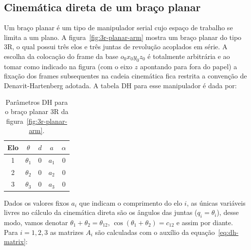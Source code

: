 \subsection{Cinemática direta de um braço planar}

Um braço planar é um tipo de manipulador serial cujo espaço de trabalho se
limita a um plano. A figura~\ref{fig:3r-planar-arm} mostra um braço planar do
tipo 3R, o qual possui três elos e três juntas de revolução acoplados em série.
A escolha da colocação do frame da base \(o_0x_0y_0z_0\) é totalmente
arbitrária e ao tomar como indicado na figura (com o eixo \(z\) apontando para
fora do papel) a fixação dos frames subsequentes na cadeia cinemática fica
restrita a convenção de Denavit-Hartenberg adotada. A tabela DH para esse
manipulador é dada por:

\begin{table}[htbp]
    \centering
    \begin{tabular}{c c c c c}
        \toprule
        \textbf{Elo} & \(\theta\)   & \(d\) & \(a\)   & \(\alpha\) \\
        \midrule
        1            & \(\theta_1\) & 0     & \(a_1\) & 0          \\
        2            & \(\theta_2\) & 0     & \(a_2\) & 0          \\
        3            & \(\theta_3\) & 0     & \(a_3\) & 0          \\
        \bottomrule
    \end{tabular}
    \caption{Parâmetros DH para o braço planar 3R da figura~\ref{fig:3r-planar-arm}.}\label{tab:dh-parameters-planar-arm}
\end{table}

Dados os valores fixos \(a_i\) que indicam o comprimento do elo \(i\), as
únicas variáveis livres no cálculo da cinemática direta são os ângulos das
juntas ($q_i = \theta_i$), desse modo, vamos denotar \(\theta_1 + \theta_2 =
\theta_{12}\), \(\cos(\theta_1 + \theta_2) = c_{12}\) e assim por diante. Para
\(i = 1, 2, 3\) as matrizes $A_i$ são calculadas com o auxílio da
equação~\ref{eq:dh-matrix}:

